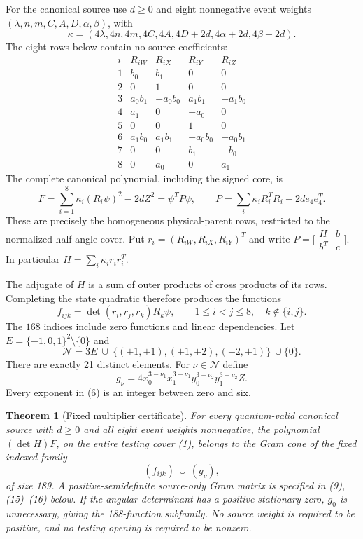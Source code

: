 \documentclass[11pt]{article}
\newtheorem{theorem}{Theorem}
\begin{document}
For the canonical source use $d\geq0$ and eight nonnegative event weights
$(\lambda,n,m,C,A,D,\alpha,\beta)$, with
\[
 \kappa=(4\lambda,4n,4m,4C,4A,4D+2d,4\alpha+2d,4\beta+2d).
\]
The eight rows below contain no source coefficients:
\[
\begin{array}{c|rrrr}
i&R_{iW}&R_{iX}&R_{iY}&R_{iZ}\\\hline
1&b_0&b_1&0&0\\
2&0&1&0&0\\
3&a_0b_1&-a_0b_0&a_1b_1&-a_1b_0\\
4&a_1&0&-a_0&0\\
5&0&0&1&0\\
6&a_1b_0&a_1b_1&-a_0b_0&-a_0b_1\\
7&0&0&b_1&-b_0\\
8&0&a_0&0&a_1
\end{array}                                                        \tag{2}
\]
The complete canonical polynomial, including the signed core, is
\[
 F=\sum_{i=1}^8\kappa_i(R_i\psi)^2-2dZ^2
   =\psi^TP\psi,\qquad
 P=\sum_i\kappa_iR_i^TR_i-2d e_4e_4^T.                \tag{3}
\]
These are precisely the homogeneous physical-parent rows, restricted to
the normalized half-angle cover.  Put $r_i=(R_{iW},R_{iX},R_{iY})^T$ and
write $P=\bigl[\begin{smallmatrix}H&b\\b^T&c\end{smallmatrix}\bigr]$.
In particular $H=\sum_i\kappa_i r_ir_i^T$.

The adjugate of $H$ is a sum of outer products of cross products of its
rows. Completing the state quadratic therefore produces the functions
\[
 f_{ijk}=\det(r_i,r_j,r_k)R_k\psi,
 \qquad 1\leq i<j\leq8,\quad k\notin\{i,j\}.          \tag{4}
\]
The $168$ indices include zero functions and linear dependencies.
Let $E=\{-1,0,1\}^2\setminus\{0\}$ and
\[
 \mathcal N=3E\ \cup\
 \{(\pm1,\pm1),(\pm1,\pm2),(\pm2,\pm1)\}\ \cup\{0\}.
                                                               \tag{5}
\]
There are exactly 21 distinct elements.  For $\nu\in\mathcal N$ define
\[
 g_\nu=4x_0^{3-\nu_1}x_1^{3+\nu_1}
           y_0^{3-\nu_2}y_1^{3+\nu_2}Z.                \tag{6}
\]
Every exponent in (6) is an integer between zero and six.

\begin{theorem}[Fixed multiplier certificate]
For every quantum-valid canonical source with $d\geq0$ and all eight
event weights nonnegative, the polynomial $(\det H)F$, on the entire
testing cover (1), belongs to the Gram cone of the fixed indexed family
\[
                    (f_{ijk})\ \cup\ (g_\nu),          \tag{7}
\]
of size 189.  A positive-semidefinite source-only Gram matrix is specified
in (9), (15)--(16) below.  If the angular determinant has a positive
stationary zero, $g_0$ is unnecessary, giving the 188-function subfamily.
No source weight is required to be positive, and no testing opening is
required to be nonzero.
\end{theorem}
\end{document}
